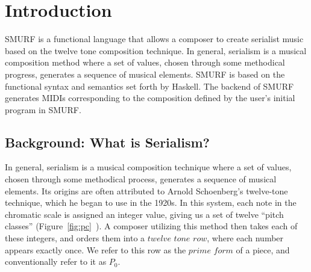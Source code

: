\section{Introduction}

SMURF is a functional language that allows a composer to create serialist music
based on the twelve tone composition technique. In general, serialism is a musical composition
method where a set of values, chosen through some methodical progress,
generates a sequence of musical elements. SMURF is based on the
functional syntax and semantics set forth by Haskell. The backend of
SMURF generates MIDIs corresponding to the composition defined by the 
user's initial program in SMURF. 


\subsection{Background: What is Serialism?}

In general, serialism is a musical composition technique where a set of values, chosen through some 
methodical process, generates a sequence of musical elements. Its origins are often attributed to
Arnold Schoenberg's twelve-tone technique, which he began to use in the 1920s. In this system, 
each note in the chromatic scale is assigned an integer value, giving us a set of twelve
``pitch classes'' (Figure~\ref{fig:pc}~\cite{appleby2013accidentals}). A composer utilizing this 
method then takes each of these integers, and orders them into a $twelve$ $tone$ $row$, where 
each number appears exactly once. We refer to this row as the $prime$ $form$ of a piece, 
and conventionally refer to it as $P_0$. 

